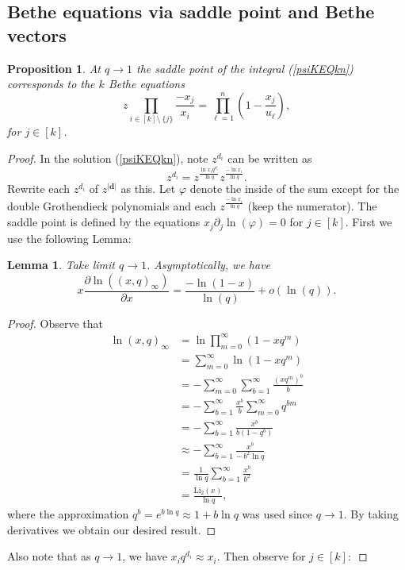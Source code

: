 \documentclass[12pt]{article}
\newtheorem{proposition}[theorem]{Proposition}
\newtheorem{lemma}[theorem]{Lemma}%
\theoremstyle{plain}
\theoremstyle{definition}
\newcommand{\db}{\boldsymbol{d}}
\begin{document}
\subsection{Bethe equations via saddle point and Bethe vectors}


\begin{proposition}
    At $q\to 1$ the saddle point of the integral (\ref{psiKEQkn}) corresponds to the $k$ Bethe equations
    \begin{equation}
        z \prod \limits_{i\in [k]\setminus\  \{j\}}\frac{-x_j}{x_i} = \prod \limits_{\ell=1}^n \left(1-\frac{x_j}{u_\ell}\right), 
    \end{equation}
    for $j\in [k]$.
\end{proposition}
\begin{proof}
   In the solution (\ref{psiKEQkn}), note $z^{d_i}$ can be written as
$$z^{d_i} = z^{\frac{\ln x_i q^{d_i}}{\ln q}}z^{\frac{-\ln x_i}{\ln q}}.$$
   Rewrite each $z^{d_i}$ of $z^{|\db|}$ as this.
   Let $\varphi$ denote the inside of the sum except for the double Grothendieck polynomials and each $z^{\frac{-\ln x_i}{\ln q}}$ (keep the numerator). The saddle point is defined by the equations $x_j \partial_j \ln(\varphi) =0$ for $j\in [k]$. First we use the following Lemma:

\begin{lemma}
    Take limit $q\to 1$. Asymptotically, we have
   $$x\frac{\partial \ln ((x,q)_\infty)}{\partial x} = \frac{-\ln(1-x)}{\ln(q)} +o(\ln(q)). $$
\end{lemma}
\begin{proof}
    Observe that 
    \begin{align*}
\ln (x,q)_\infty
&= \ln \prod_{m=0}^\infty (1 - x q^m) \\
&= \sum_{m=0}^\infty \ln(1 - x q^m) \\
&= - \sum_{m=0}^\infty \sum_{b=1}^\infty \frac{(x q^m)^b}{b} \\
&= - \sum_{b=1}^\infty \frac{x^b}{b} \sum_{m=0}^\infty q^{bm} \\
&= - \sum_{b=1}^\infty \frac{x^b}{b(1 - q^b)} \\
&\approx - \sum_{b=1}^\infty \frac{x^b}{-\,b^2 \ln q} \\
&= \frac{1}{\ln q} \sum_{b=1}^\infty \frac{x^b}{b^2} \\
&= \frac{\mathrm{Li}_2(x)}{\ln q},
\end{align*}
where the approximation $q^b=e^{b\ln q} \approx 1 +b\ln q$ was used since $q\to 1$. By taking derivatives we obtain our desired result.
\end{proof}
Also note that as $q\to 1$, we have $x_iq^{d_i} \approx x_i$. Then observe for $j\in [k]:$ 


\end{proof}
\end{document}
